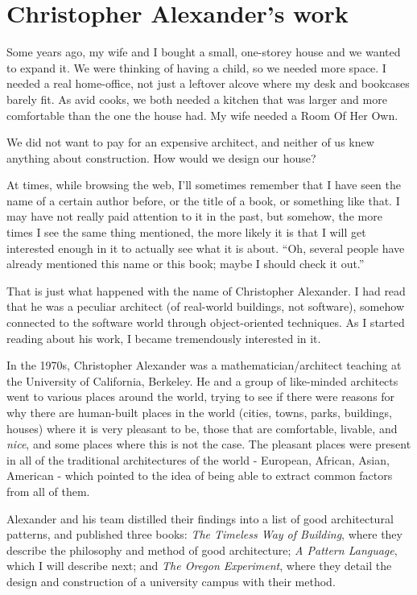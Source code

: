 \section*{Christopher Alexander's work}

Some years ago, my wife and I bought a small, one-storey house and we wanted to expand it. We were thinking of having a child, so we needed more space. I needed a real home-office, not just a leftover alcove where my desk and bookcases barely fit. As avid cooks, we both needed a kitchen that was larger and more comfortable than the one the house had. My wife needed a Room Of Her Own.

We did not want to pay for an expensive architect, and neither of us knew anything about construction.  How would we design our house?

At times, while browsing the web, I'll sometimes remember that I have seen the name of a certain author before, or the title of a book, or something like that. I may have not really paid attention to it in the past, but somehow, the more times I see the same thing mentioned, the more likely it is that I will get interested enough in it to actually see what it is about. ``Oh, several people have already mentioned this name or this book; maybe I should check it out.''

That is just what happened with the name of Christopher Alexander. I had read that he was a peculiar architect (of real-world buildings, not software), somehow connected to the software world through object-oriented techniques. As I started reading about his work, I became tremendously interested in it.

In the 1970s, Christopher Alexander was a mathematician/architect teaching at the University of California, Berkeley. He and a group of like-minded architects went to various places around the world, trying to see if there were reasons for why there are human-built places in the world (cities, towns, parks, buildings, houses) where it is very pleasant to be, those that are comfortable, livable, and \textit{nice}, and some places where this is not the case. The pleasant places were present in all of the traditional architectures of the world - European, African, Asian, American - which pointed to the idea of being able to extract common factors from all of them.

Alexander and his team distilled their findings into a list of good architectural patterns, and published three books: \textit{The Timeless Way of Building}, where they describe the philosophy and method of good architecture; \textit{A Pattern Language}, which I will describe next; and \textit{The Oregon Experiment}, where they detail the design and construction of a university campus with their method.

